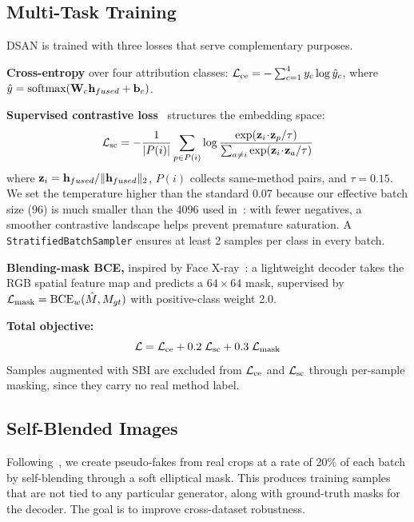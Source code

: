 \subsection{Multi-Task Training}
\label{sec:multitask}

DSAN is trained with three losses that serve complementary purposes.

\textbf{Cross-entropy} over four attribution classes: $\mathcal{L}_{\text{ce}} = -\sum_{c=1}^{4} y_c \log \hat{y}_c$, where $\hat{y} = \text{softmax}(\mathbf{W}_c \mathbf{h}_{fused} + \mathbf{b}_c)$.

\textbf{Supervised contrastive loss}~\cite{khosla2020supervised} structures the embedding space:
\begin{equation}
    \mathcal{L}_{\text{sc}} = -\frac{1}{|P(i)|} \sum_{p \in P(i)} \log \frac{\exp(\mathbf{z}_i \!\cdot\! \mathbf{z}_p / \tau)}{\sum_{a \neq i} \exp(\mathbf{z}_i \!\cdot\! \mathbf{z}_a / \tau)}
    \label{eq:supcon}
\end{equation}
where $\mathbf{z}_i = \mathbf{h}_{fused}/\|\mathbf{h}_{fused}\|_2$, $P(i)$ collects same-method pairs, and $\tau = 0.15$. We set the temperature higher than the standard 0.07 because our effective batch size (96) is much smaller than the 4096 used in~\cite{khosla2020supervised}: with fewer negatives, a smoother contrastive landscape helps prevent premature saturation. A \texttt{StratifiedBatchSampler} ensures at least 2 samples per class in every batch.

\textbf{Blending-mask BCE,} inspired by Face X-ray~\cite{li2020facexray}: a lightweight decoder takes the RGB spatial feature map and predicts a $64\!\times\!64$ mask, supervised by $\mathcal{L}_{\text{mask}} = \text{BCE}_w(\hat{M}, M_{gt})$ with positive-class weight 2.0.

\textbf{Total objective:}
\begin{equation}
    \mathcal{L} = \mathcal{L}_{\text{ce}} + 0.2\;\mathcal{L}_{\text{sc}} + 0.3\;\mathcal{L}_{\text{mask}}
    \label{eq:total}
\end{equation}
Samples augmented with SBI are excluded from $\mathcal{L}_{\text{ce}}$ and $\mathcal{L}_{\text{sc}}$ through per-sample masking, since they carry no real method label.

\subsection{Self-Blended Images}
Following~\cite{shiohara2022sbi}, we create pseudo-fakes from real crops at a rate of 20\% of each batch by self-blending through a soft elliptical mask. This produces training samples that are not tied to any particular generator, along with ground-truth masks for the decoder. The goal is to improve cross-dataset robustness.

